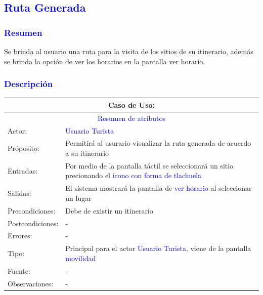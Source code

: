 \newpage
\pagebreak

\subsection{\textcolor{blue}{Ruta Generada}}
\subsubsection{\textcolor{blue}{Resumen}}
Se brinda al usuario una ruta para la visita de los sitios de su itinerario, además se brinda la
opción de ver los horarios en la pantalla ver horario.
\subsubsection{\textcolor{blue}{Descripción}}
\begin{tabularx}{16cm}{||l|X||}
	\hline
	\multicolumn{2}{||c||}{Caso de Uso: } \\
	\hline
	\multicolumn{2}{||c||}{\textcolor{blue}{Resumen de atributos}} \\
	\hline
	{Actor:} & {\textcolor{blue}{Usuario Turista}} \\
	\hline
	{Próposito:} & {Permitirá al usurario visualizar la ruta generada de acuerdo a su itinerario} \\
	\hline
	{Entradas:} & {Por medio de la pantalla táctil se seleccionará un sitio precionando el \textcolor{blue}{icono con forma de tlachuela}}\\
	\hline
	{Salidas:} & {El sistema mostrará la pantalla de \textcolor{blue}{ver horario} al seleccionar un lugar}\\
	\hline
	{Precondiciones:} & {Debe de existir un itinerario}\\ 
	\hline
	{Postcondiciones:} & {-}\\
	\hline
	{Errores:} & {-} \\
	\hline
	{Tipo:} & {Principal para el actor \textcolor{blue}{Usuario Turista}, viene de la pantalla \textcolor{blue}{movilidad}}\\
	\hline
	{Fuente:} & {-} \\
	\hline
	{Observaciones:} & {-} \\
	\hline
\end{tabularx}

\pagebreak
